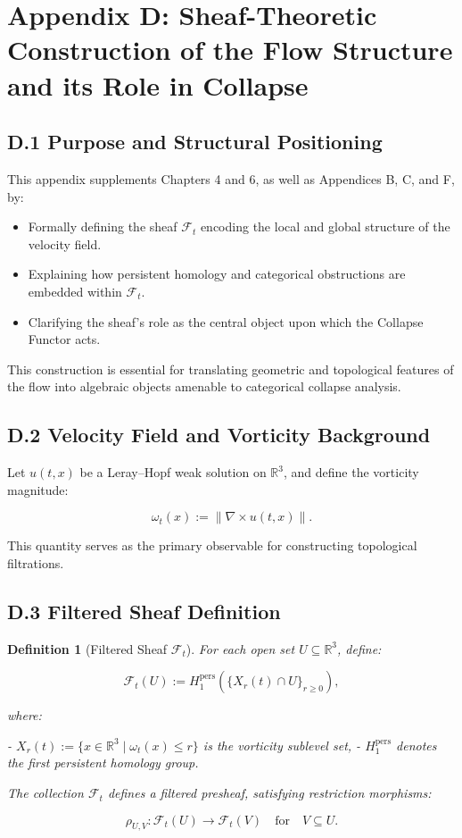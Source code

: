 \documentclass[11pt]{article}
\newtheorem{definition}[theorem]{Definition}
\begin{document}
\section*{Appendix D: Sheaf-Theoretic Construction of the Flow Structure and its Role in Collapse}

\subsection*{D.1 Purpose and Structural Positioning}

This appendix supplements Chapters 4 and 6, as well as Appendices B, C, and F, by:

\begin{itemize}
  \item Formally defining the sheaf \( \mathcal{F}_t \) encoding the local and global structure of the velocity field.
  \item Explaining how persistent homology and categorical obstructions are embedded within \( \mathcal{F}_t \).
  \item Clarifying the sheaf's role as the central object upon which the Collapse Functor acts.
\end{itemize}

This construction is essential for translating geometric and topological features of the flow into algebraic objects amenable to categorical collapse analysis.

\subsection*{D.2 Velocity Field and Vorticity Background}

Let \( u(t, x) \) be a Leray–Hopf weak solution on \( \mathbb{R}^3 \), and define the vorticity magnitude:

\[
\omega_t(x) := \| \nabla \times u(t, x) \|.
\]

This quantity serves as the primary observable for constructing topological filtrations.

\subsection*{D.3 Filtered Sheaf Definition}

\begin{definition}[Filtered Sheaf \( \mathcal{F}_t \)]
For each open set \( U \subseteq \mathbb{R}^3 \), define:

\[
\mathcal{F}_t(U) := H_1^{\mathrm{pers}} \left( \{ X_r(t) \cap U \}_{r \geq 0} \right),
\]

where:

- \( X_r(t) := \{ x \in \mathbb{R}^3 \mid \omega_t(x) \leq r \} \) is the vorticity sublevel set,
- \( H_1^{\mathrm{pers}} \) denotes the first persistent homology group.

The collection \( \mathcal{F}_t \) defines a filtered presheaf, satisfying restriction morphisms:

\[
\rho_{U, V} : \mathcal{F}_t(U) \to \mathcal{F}_t(V) \quad \text{for} \quad V \subseteq U.
\]
\end{definition}
\end{document}
